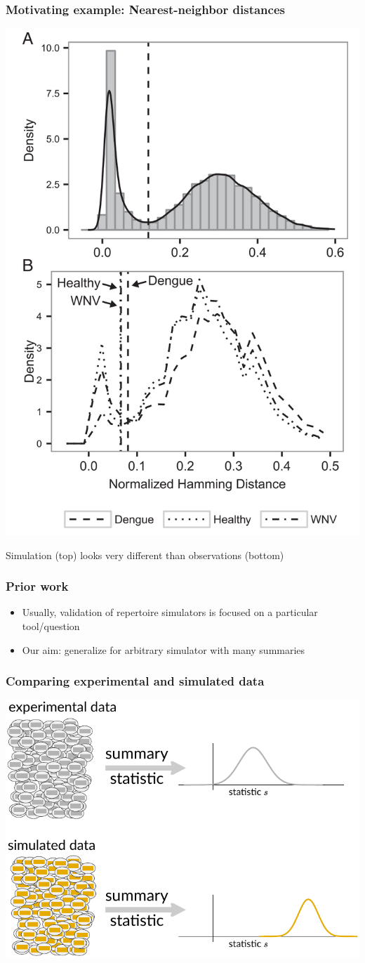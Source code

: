 \documentclass[mathserif,compress]{beamer}
\renewcommand\;{\,}
\begin{document}
\begin{frame}

\begin{center}\frametitle{Motivating example: Nearest-neighbor distances}
\includegraphics[width=0.4\linewidth]{Images/Dengue.png}
\end{center}
Simulation (top) looks very different than observations (bottom)
\end{frame}

\begin{frame}\frametitle{Prior work}
\begin{itemize}
\item
Usually, validation of repertoire simulators is focused on a particular tool/question
\medskip
\bigskip
\item Our aim: generalize for arbitrary simulator with many summaries
\end{itemize}
\end{frame}

\begin{frame}\frametitle{Comparing experimental and simulated data}
\begin{center}
\includegraphics[width=\linewidth]{Images/summary-stats.pdf}
\end{center}
\end{frame}
\end{document}
